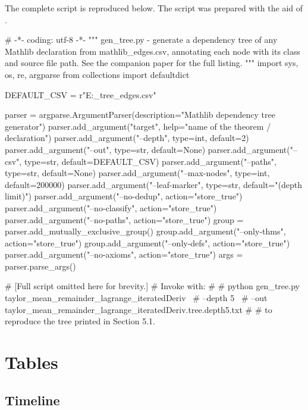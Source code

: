 \documentclass[11pt,reqno]{amsart}
\begin{document}
\noindent The complete script is reproduced below. The script was prepared
with the aid of \cite{deepseek-chat}.

\text{ \ } \text{ \ } 
\begin{verbatimbox}
# -*- coding: utf-8 -*-
"""
gen_tree.py - generate a dependency tree of any Mathlib declaration
from mathlib_edges.csv, annotating each node with its class and
source file path.  See the companion paper for the full listing.
"""
import sys, os, re, argparse
from collections import defaultdict

DEFAULT_CSV = r"E:\archives\Processings\MathsTools\mathlib_tree\mathlib_edges.csv"

parser = argparse.ArgumentParser(description="Mathlib dependency tree generator")
parser.add_argument("target", help="name of the theorem / declaration")
parser.add_argument("--depth", type=int, default=2)
parser.add_argument("--out", type=str, default=None)
parser.add_argument("--csv", type=str, default=DEFAULT_CSV)
parser.add_argument("--paths", type=str, default=None)
parser.add_argument("--max-nodes", type=int, default=200000)
parser.add_argument("--leaf-marker", type=str, default="(depth limit)")
parser.add_argument("--no-dedup", action="store_true")
parser.add_argument("--no-classify", action="store_true")
parser.add_argument("--no-paths", action="store_true")
group = parser.add_mutually_exclusive_group()
group.add_argument("--only-thms", action="store_true")
group.add_argument("--only-defs", action="store_true")
parser.add_argument("--no-axioms", action="store_true")
args = parser.parse_args()

# [Full script omitted here for brevity.]
# Invoke with:
#
#   python gen_tree.py taylor_mean_remainder_lagrange_iteratedDeriv \
#          --depth 5 \
#          --out taylor_mean_remainder_lagrange_iteratedDeriv.tree.depth5.txt
#
#  to reproduce the tree printed in Section 5.1.
\end{verbatimbox}
\setstretch{1.5}

\section{Tables}

\label{sec:tables}

\subsection{Timeline}

\label{sec:timeline}
\end{document}
